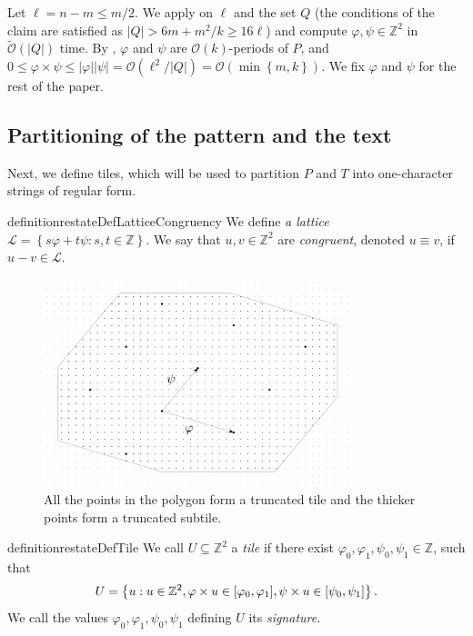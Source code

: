 \documentclass[twoside,leqno]{article}
\newcommand{\Z}{\mathbb{Z}}
\renewcommand{\O}{\mathcal{O}}
\newcommand{\tO}{\tilde{\mathcal{O}}}
\renewcommand{\L}{\mathcal{L}}
\renewcommand{\phi}{\varphi}
\newcommand{\set}[1]{\left\lbrace #1 \right\rbrace}
\newcommand{\absolute}[1]{\left\lvert#1\right\rvert}
\begin{document}
Let $\ell = n - m \le m / 2$. We apply  on $\ell$ and the set $Q$ (the conditions of the claim are satisfied as $\absolute{Q} > 6m + m^2/k \ge 16\ell$) and compute $\phi, \psi \in \Z^2$ in $\tO(\absolute{Q})$ time. By , $\phi$ and $\psi$ are $\O(k)$-periods of $P$, and $0 \le \phi \times \psi \le \absolute{\phi}\absolute{\psi} = \O(\ell^2 / \absolute{Q}) =  \O(\min\set{m, k})$. We fix $\phi$ and $\psi$ for the rest of the paper.

\subsection{Partitioning of the pattern and the text}
Next, we define tiles, which will be used to partition $P$ and $T$ into one-character strings of regular form.

\begin{restatable*}{definition}{restateDefLatticeCongruency}\label{lattice_congruency}
We define \emph{a lattice} $\L = \set{s\phi + t\psi : s, t \in \Z}$. We say that $u, v \in \Z^2$ are \emph{congruent}, denoted $u \equiv v$, if $u - v \in \L$. 
\end{restatable*}

\begin{figure}[h!]
	\begin{center}
		\includegraphics[width=0.8\textwidth]{drawings/parquet}
	\end{center}
	\caption{All the points in the polygon form a truncated tile and the thicker points form a truncated subtile.}
	\label{figure:tile}
\end{figure}

\begin{restatable*}[Tile]{definition}{restateDefTile}\label{tile_definition}
We call $U \subseteq \Z^2$ a \emph{tile} if there exist $\phi_0, \phi_1, \psi_0, \psi_1 \in \Z$, such that
	\[ U = \set{u : u \in \Z^2, \h{u} \in [\phi_0, \phi_1], \s{u} \in [\psi_0, \psi_1]}. \]
We call the values $\phi_0, \phi_1, \psi_0, \psi_1$ defining $U$ its \emph{signature}. 
\end{restatable*}
\end{document}
